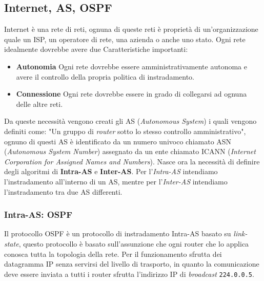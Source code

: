     \subsection[Internet, \texttt{AS}, \texttt{OSPF}]{Internet, \Acrshort*{AS}, \Acrshort*{OSPF}}
        Internet è una rete di reti, ognuna di queste reti è proprietà di un'organizzazione quale un \Acrshort*{ISP}, un operatore di rete, una azienda o anche uno stato. Ogni rete idealmente dovrebbe avere due Caratteristiche importanti: \begin{itemize}
            \item \textbf{Autonomia} Ogni rete dovrebbe essere amministrativamente autonoma e avere il controllo della propria politica di instradamento.
            \item \textbf{Connessione} Ogni rete dovrebbe essere in grado di collegarsi ad ognuna delle altre reti.
        \end{itemize}
        Da queste necessità vengono creati gli \Acrshort*{AS} (\textit{Autonomous System}) i quali vengono definiti come: "Un gruppo di \textit{router} sotto lo stesso controllo amministrativo", ognuno di questi \Acrshort*{AS} è identificato da un numero univoco chiamato \Acrshort*{ASN} (\textit{Autonomous System Number}) assegnato da un ente chiamato \Acrshort*{ICANN} (\textit{Internet Corporation for Assigned Names and Numbers}). \newline
        Nasce ora la necessità di definire degli algoritmi di \textbf{Intra-\Acrshort*{AS}} e \textbf{Inter-\Acrshort*{AS}}. Per l'\textit{Intra-\Acrshort*{AS}} intendiamo l'instradamento all'interno di un \Acrshort*{AS}, mentre per l'\textit{Inter-\Acrshort*{AS}} intendiamo l'instradamento tra due \Acrshort*{AS} differenti.
        \subsubsection{Intra-\Acrshort*{AS}: \acrfull*{OSPF}}
            Il protocollo \Acrshort*{OSPF} è un protocollo di instradamento Intra-\Acrshort*{AS} basato su \textit{link-state}, questo protocollo è basato sull'assunzione che ogni router che lo applica conosca tutta la topologia della rete. Per il funzionamento sfrutta dei datagramma \Acrshort*{IP} senza servirsi del livello di trasporto, in quanto la comunicazione deve essere inviata a tutti i router sfrutta l'indirizzo \Acrshort*{IP} di \textit{broadcast} \texttt{224.0.0.5}.
